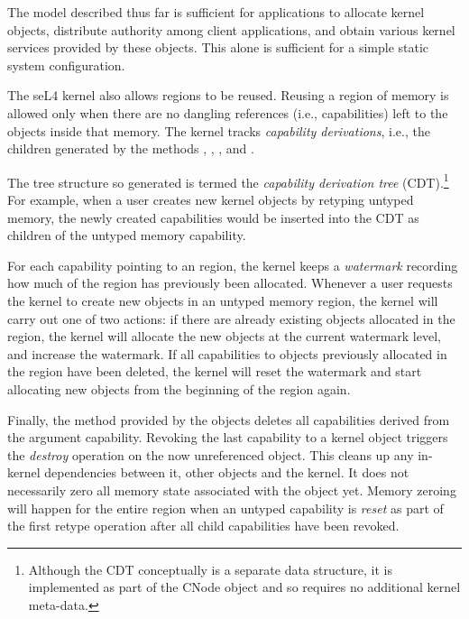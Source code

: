 The model described thus far is sufficient for applications to
allocate kernel objects, distribute authority among client
applications, and obtain various kernel services provided by these
objects.  This alone is sufficient for a simple static system
configuration.

The seL4 kernel also allows  regions to be reused.
Reusing a region of memory is allowed only
when there are no dangling references (i.e., capabilities) left to the
objects inside that memory.  The kernel tracks
\emph{capability derivations}, i.e., the children generated by the
methods , , , and
.

The tree structure so generated is termed the \emph{capability
derivation tree} (CDT).\footnote{Although the CDT conceptually is a separate
data structure, it is implemented as part of the CNode object and so
requires no additional kernel meta-data.}  For example, when a user
creates new kernel objects by retyping untyped memory, the newly created
capabilities would be inserted into the CDT as children of the untyped
memory capability.

For each  capability pointing to an  region,
the kernel keeps a \emph{watermark} recording how much of the region has
previously been allocated. Whenever a user requests the kernel to create new
objects in an untyped memory region, the kernel will carry out one of two
actions: if there are already existing objects allocated in the region, the
kernel will allocate the new objects at the current watermark level, and
increase the watermark. If all capabilities to objects previously allocated in
the region have been deleted, the kernel will reset the watermark and start
allocating new objects from the beginning of the region again.

Finally, the  method provided by
the  objects deletes all capabilities derived from the argument
capability. Revoking the last capability to a kernel object triggers the
\emph{destroy} operation on the now unreferenced object. This cleans up any
in-kernel dependencies between it, other objects and the kernel. It does not
necessarily zero all memory state associated with the object yet. Memory zeroing
will happen for the entire region when an untyped capability is \emph{reset} as
part of the first retype operation after all child capabilities have been
revoked.

